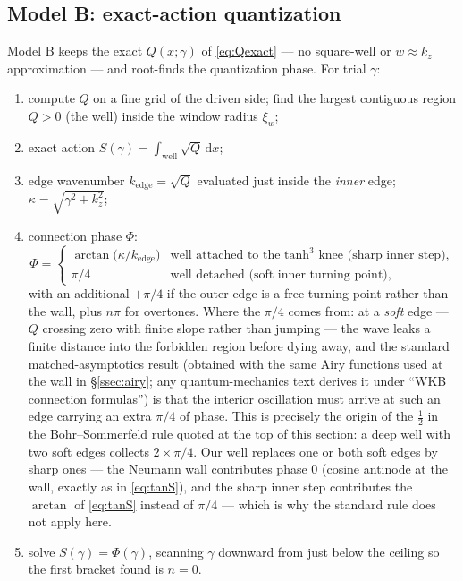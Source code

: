\documentclass[11pt,a4paper]{article}
\numberwithin{equation}{section}
\theoremstyle{remark}
\newcommand{\kz}{k_z}
\newcommand{\dd}{\mathrm{d}}
\begin{document}
\subsection{Model B: exact-action quantization}
\label{ssec:modelB}

Model B keeps the exact $Q(x;\gamma)$ of \eqref{eq:Qexact} --- no
square-well or $w\approx\kz$ approximation --- and root-finds the
quantization phase. For trial $\gamma$:
\begin{enumerate}
\item compute $Q$ on a fine grid of the driven side; find the largest
contiguous region $Q>0$ (the well) inside the window radius $\xi_w$;
\item exact action $S(\gamma)=\int_{\mathrm{well}}\sqrt{Q}\,\dd x$;
\item edge wavenumber $k_{\mathrm{edge}}=\sqrt{Q}$ evaluated just inside
the \emph{inner} edge; $\kappa=\sqrt{\gamma^2+\kz^2}$;
\item connection phase $\Phi$:
\begin{equation}
\Phi=
\begin{cases}
\arctan\bigl(\kappa/k_{\mathrm{edge}}\bigr) &
\text{well attached to the tanh$^3$ knee (sharp inner step)},\\[2pt]
\pi/4 & \text{well detached (soft inner turning point)},
\end{cases}
\label{eq:phases}
\end{equation}
with an additional $+\pi/4$ if the outer edge is a free turning point
rather than the wall, plus $n\pi$ for overtones. Where the $\pi/4$
comes from: at a \emph{soft} edge --- $Q$ crossing zero with finite
slope rather than jumping --- the wave leaks a finite distance into the
forbidden region before dying away, and the standard matched-asymptotics
result (obtained with the same Airy functions used at the wall in
\S\ref{ssec:airy}; any quantum-mechanics text derives it under ``WKB
connection formulas'') is that the interior oscillation must arrive at
such an edge carrying an extra $\pi/4$ of phase. This is precisely the
origin of the $\tfrac12$ in the Bohr--Sommerfeld rule quoted at the top
of this section: a deep well with two soft edges collects
$2\times\pi/4$. Our well replaces one or both soft edges by sharp ones
--- the Neumann wall contributes phase $0$ (cosine antinode at the
wall, exactly as in \eqref{eq:tanS}), and the sharp inner step
contributes the $\arctan$ of \eqref{eq:tanS} instead of $\pi/4$ ---
which is why the standard rule does not apply here.
\item solve $S(\gamma)=\Phi(\gamma)$, scanning $\gamma$ downward from just
below the ceiling so the first bracket found is $n=0$.
\end{enumerate}
\end{document}
